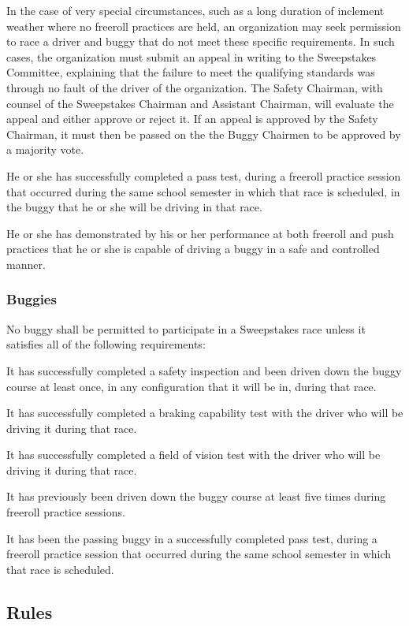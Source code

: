 In the case of very special circumstances, such as a long duration of inclement weather where no freeroll practices are held, an organization may seek permission to race a driver and buggy that do not meet these specific requirements. In such cases, the organization must submit an appeal in writing to the Sweepstakes Committee, explaining that the failure to meet the qualifying standards was through no fault of the driver of the organization. The Safety Chairman, with counsel of the Sweepstakes Chairman and Assistant Chairman, will evaluate the appeal and either approve or reject it. If an appeal is approved by the Safety Chairman, it must then be passed on the the Buggy Chairmen to be approved by a majority vote.

He or she has successfully completed a pass test, during a freeroll practice session that occurred during the same school semester in which that race is scheduled, in the buggy that he or she will be driving in that race.

He or she has demonstrated by his or her performance at both freeroll and push practices that he or she is capable of driving a buggy in a safe and controlled manner.

\subsubsection{Buggies}

No buggy shall be permitted to participate in a Sweepstakes race unless it satisfies all of the following requirements:

It has successfully completed a safety inspection and been driven down the buggy course at least once, in any configuration that it will be in, during that race.

It has successfully completed a braking capability test with the driver who will be driving it during that race.

It has successfully completed a field of vision test with the driver who will be driving it during that race.

It has previously been driven down the buggy course at least five times during freeroll practice sessions.

It has been the passing buggy in a successfully completed pass test, during a freeroll practice session that occurred during the same school semester in which that race is scheduled.

\subsection{Rules}

